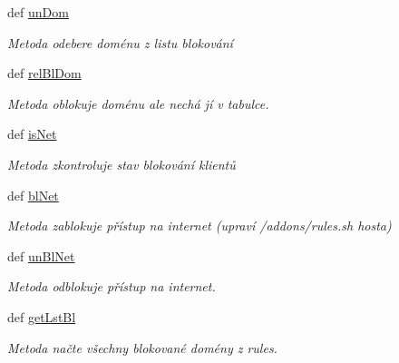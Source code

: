 \begin{DoxyCompactItemize}
def \hyperlink{classfwSetUp_1_1fwSetUp_a3a03c76b94db3bc750260ab64d76d755}{un\-Dom}
\begin{DoxyCompactList}\small\item\em Metoda odebere doménu z listu blokování \end{DoxyCompactList}\item 
def \hyperlink{classfwSetUp_1_1fwSetUp_ab96ab2edba8c87302754c40491ca0d17}{rel\-Bl\-Dom}
\begin{DoxyCompactList}\small\item\em Metoda oblokuje doménu ale nechá jí v tabulce. \end{DoxyCompactList}\item 
def \hyperlink{classfwSetUp_1_1fwSetUp_a75a8c09d8493ac43747cb4c518bef7dd}{is\-Net}
\begin{DoxyCompactList}\small\item\em Metoda zkontroluje stav blokování klientů \end{DoxyCompactList}\item 
def \hyperlink{classfwSetUp_1_1fwSetUp_a4d21f86d17c54919fbdc2e3f069fa471}{bl\-Net}
\begin{DoxyCompactList}\small\item\em Metoda zablokuje přístup na internet (upraví /addons/rules.sh hosta) \end{DoxyCompactList}\item 
def \hyperlink{classfwSetUp_1_1fwSetUp_a4f770f10b81c0030b1753dfb60452045}{un\-Bl\-Net}
\begin{DoxyCompactList}\small\item\em Metoda odblokuje přístup na internet. \end{DoxyCompactList}\item 
def \hyperlink{classfwSetUp_1_1fwSetUp_a9d56382f2c43c78f6dcf2057580a5ed2}{get\-Lst\-Bl}
\begin{DoxyCompactList}\small\item\em Metoda načte všechny blokované domény z rules. \end{DoxyCompactList}\end{DoxyCompactItemize}
